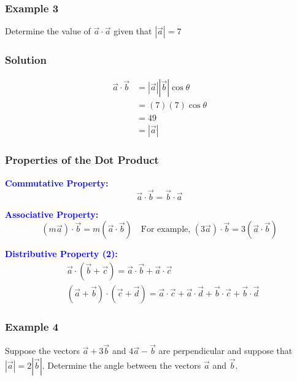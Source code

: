 \documentclass{article}
\begin{document}
\subsubsection*{Example 3}
Determine the value of $\vec{a} \cdot \vec{a}$ given that $|\vec{a}|=7$
\subsubsection*{Solution}
\begin{align*}
    \vec{a}\cdot \vec{b}&=|\vec{a}||\vec{b}|\cos \theta\\
    &=(7)(7)\cos \theta\\
    &=49\\
    &=|\vec{a}|
\end{align*}
\subsubsection{Properties of the Dot Product}
\textcolor{blue}{\textbf{Commutative Property:}}
\[
\vec{a} \cdot \vec{b}=\vec{b} \cdot \vec{a}
\]

\textcolor{blue}{\textbf{Associative Property:}}
\[
(m \vec{a}) \cdot \vec{b}=m(\vec{a} \cdot \vec{b}) \quad \text{For example, } (3 \vec{a}) \cdot \vec{b}=3(\vec{a} \cdot \vec{b})
\]

\textcolor{blue}{\textbf{Distributive Property (2):}}
\[
\begin{aligned}
& \vec{a} \cdot(\vec{b}+\vec{c})=\vec{a} \cdot \vec{b}+\vec{a} \cdot \vec{c} \\
& (\vec{a}+\vec{b}) \cdot(\vec{c}+\vec{d})=\vec{a} \cdot \vec{c}+\vec{a} \cdot \vec{d}+\vec{b} \cdot \vec{c}+\vec{b} \cdot \vec{d}
\end{aligned}
\]

\subsubsection*{Example 4}
Suppose the vectors $\vec{a}+3 \vec{b}$ and $4 \vec{a}-\vec{b}$ are perpendicular and suppose that $|\vec{a}|=2|\vec{b}|$. Determine the angle between the vectors $\vec{a}$ and $\vec{b}$.
\end{document}
